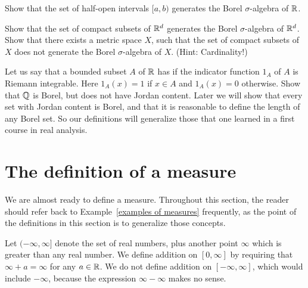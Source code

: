 \begin{exercise}
Show that the set of half-open intervals $[a, b)$ generates the Borel $\sigma$-algebra of $\mathbb{R}$.
\end{exercise}

\begin{exercise}
Show that the set of compact subsets of $\mathbb{R}^{d}$ generates the Borel $\sigma$-algebra of $\mathbb{R}^{d}$.
Show that there exists a metric space $X$, such that the set of compact subsets of $X$ does not generate the Borel $\sigma$-algebra of $X$. (Hint: Cardinality!)
\end{exercise}

\begin{exercise}\label{Jordan content 1}
Let us say that a bounded subset $A$ of $\mathbb{R}$ has  if the indicator function $1_{A}$ of $A$ is Riemann integrable.
Here $1_{A}(x) = 1$ if $x \in A$ and $1_{A}(x) = 0$ otherwise.
Show that $\mathbb{Q}$ is Borel, but does not have Jordan content.
Later we will show that every set with Jordan content is Borel, and that it is reasonable to define the length of any Borel set.
So our definitions will generalize those that one learned in a first course in real analysis.
\end{exercise}


\section{The definition of a measure}
We are almost ready to define a measure.
Throughout this section, the reader should refer back to Example~\ref{examples of measures} frequently, as the point of the definitions in this section is to generalize those concepts.

\begin{subsec}
Let $(-\infty, \infty]$ denote the set of real numbers, plus another point $\infty$ which is greater than any real number.
We define addition on $[0, \infty]$ by requiring that $\infty + a = \infty$ for any $a \in \mathbb{R}$.
We do not define addition on $[-\infty, \infty]$, which would include $-\infty$, because the expression $\infty - \infty$ makes no sense.
\end{subsec}


